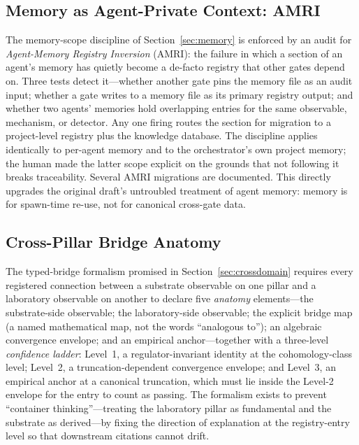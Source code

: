 \documentclass[12pt,a4paper]{article}
\begin{document}
\subsection{Memory as Agent-Private Context: AMRI}
\label{sec:floor-amri}

The memory-scope discipline of Section~\ref{sec:memory} is enforced by an audit for \emph{Agent-Memory Registry Inversion} (AMRI): the failure in which a section of an agent's memory has quietly become a de-facto registry that other gates depend on. Three tests detect it---whether another gate pins the memory file as an audit input; whether a gate writes to a memory file as its primary registry output; and whether two agents' memories hold overlapping entries for the same observable, mechanism, or detector. Any one firing routes the section for migration to a project-level registry plus the knowledge database. The discipline applies identically to per-agent memory and to the orchestrator's own project memory; the human made the latter scope explicit on the grounds that not following it breaks traceability. Several AMRI migrations are documented. This directly upgrades the original draft's untroubled treatment of agent memory: memory is for spawn-time re-use, not for canonical cross-gate data.

\subsection{Cross-Pillar Bridge Anatomy}
\label{sec:floor-bridge}

The typed-bridge formalism promised in Section~\ref{sec:crossdomain} requires every registered connection between a substrate observable on one pillar and a laboratory observable on another to declare five \emph{anatomy} elements---the substrate-side observable; the laboratory-side observable; the explicit bridge map (a named mathematical map, not the words ``analogous to''); an algebraic convergence envelope; and an empirical anchor---together with a three-level \emph{confidence ladder}: Level~1, a regulator-invariant identity at the cohomology-class level; Level~2, a truncation-dependent convergence envelope; and Level~3, an empirical anchor at a canonical truncation, which must lie inside the Level-2 envelope for the entry to count as passing. The formalism exists to prevent ``container thinking''---treating the laboratory pillar as fundamental and the substrate as derived---by fixing the direction of explanation at the registry-entry level so that downstream citations cannot drift.
\end{document}
